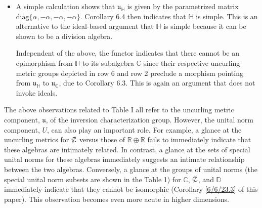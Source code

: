 \documentclass{amsart}
\numberwithin{equation}{section}
\theoremstyle{definition}
\numberwithin{theorem}{section}
\begin{document}
\begin{itemize}
 $ \left\{\left[\begin{array}{ccc}
0  & 0 & w   \\
 0 & 0 & 0 \\
 0 & 0 & 0    
\end{array}\right]:w\in\mathbb{R} \right\} $. Accordingly, there must exist a morphism between $\mathfrak{u}_{A_{11}}$ and $\mathfrak{u}_{\mathbb{D}}$  - and it clearly does by inspection of the depicted uncurling metric algebras at the end of rows 11 and 5.  
 \item A simple calculation shows that $\mathfrak{u}_{\mathbb{H}}$ is given by the parametrized matrix $\text{diag}\{\alpha,-\alpha,-\alpha,-\alpha\}$.  Corollary 6.4 then indicates that  $\mathbb{H}$ is simple.  This is an alternative to the ideal-based argument that $\mathbb{H}$ is simple because it can be shown to be a division algebra.

Independent of the above, the functor indicates that there cannot be an epimorphism from  $\mathbb{H}$ to its subalgebra $\mathbb{C}$ since 	their respective uncurling metric groups depicted in row 6 and row 2 preclude a morphism pointing from $\mathfrak{u}_{\mathbb{H}}$ to $\mathfrak{u}_{\mathbb{C}}$, due to Corollary 6.3.  This is again an argument that does not invoke ideals.
\end{itemize}

The above observations related to Table I all refer to the uncurling metric component, $\mathfrak{u}$, of the inversion characterization group.  However, the unital norm component, $U$, can also play an important role.  For example, a glance at the uncurling metrics for $\slashed{\mathbb{C}}$ versus those of $\mathbb{R}\oplus\mathbb{R}$ fails to immediately indicate that these algebras are intimately related.   In contrast, a glance at the sets of special unital norms for these algebras immediately suggests an intimate relationship between the two algebras. Conversely, a glance at the groups of unital norms (the special unital norm subsets are shown in the Table 1) for $\mathbb{C}$, $\slashed{\mathbb{C}}$, and $\mathbb{D}$ immediately indicate that they cannot be isomorphic (Corollary \ref{6/6/23.3} of this paper).  This observation becomes even more acute in higher dimensions.  
\end{document}
